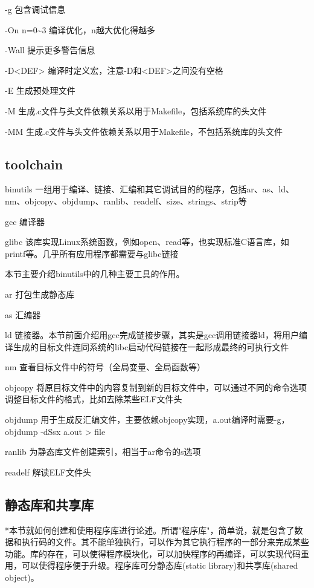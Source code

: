 \documentclass[11pt]{article}
\begin{document}
-g 包含调试信息 

-On n=0\textasciitilde{}3 编译优化，n越大优化得越多 

-Wall 提示更多警告信息 

-D<DEF> 编译时定义宏，注意-D和<DEF>之间没有空格 

-E 生成预处理文件 

-M 生成.c文件与头文件依赖关系以用于Makefile，包括系统库的头文件 

-MM 生成.c文件与头文件依赖关系以用于Makefile，不包括系统库的头文件 

\subsection{toolchain}
\label{sec-1-4}

binutils 一组用于编译、链接、汇编和其它调试目的的程序，包括ar、as、ld、nm、objcopy、objdump、ranlib、readelf、size、strings、strip等 

gcc 编译器 

glibc 该库实现Linux系统函数，例如open、read等，也实现标准C语言库，如printf等。几乎所有应用程序都需要与glibc链接 

本节主要介绍binutils中的几种主要工具的作用。 

ar 打包生成静态库 

as 汇编器 

ld 链接器。本节前面介绍用gcc完成链接步骤，其实是gcc调用链接器ld，将用户编译生成的目标文件连同系统的libc启动代码链接在一起形成最终的可执行文件 

nm 查看目标文件中的符号（全局变量、全局函数等） 

objcopy 将原目标文件中的内容复制到新的目标文件中，可以通过不同的命令选项调整目标文件的格式，比如去除某些ELF文件头 

objdump 用于生成反汇编文件，主要依赖objcopy实现，a.out编译时需要-g， objdump -dSsx a.out > file

ranlib 为静态库文件创建索引，相当于ar命令的s选项 

readelf 解读ELF文件头 

\subsection{静态库和共享库}
\label{sec-1-5}

*本节就如何创建和使用程序库进行论述。所谓"程序库"，简单说，就是包含了数据和执行码的文件。其不能单独执行，可以作为其它执行程序的一部分来完成某些功能。库的存在，可以使得程序模块化，可以加快程序的再编译，可以实现代码重用，可以使得程序便于升级。程序库可分静态库(static library)和共享库(shared object)。 
\end{document}
